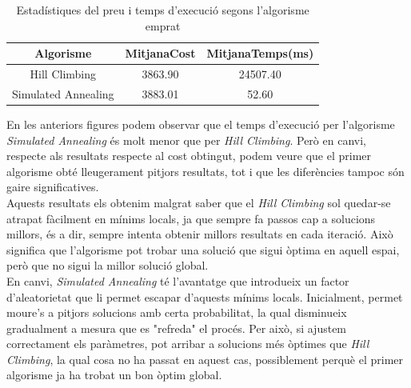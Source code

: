 \documentclass[a4paper]{article}
\begin{document}
	\begin{table}[H]
		\centering
		\begin{tabular}{|c|c|c|}
			\hline
			\textbf{Algorisme} & \textbf{MitjanaCost} & \textbf{MitjanaTemps(ms)} \\
			\hline
			Hill Climbing & 3863.90 & 24507.40\\
			\hline
			Simulated Annealing & 3883.01 & 52.60\\
			\hline
		\end{tabular}
		\caption{Estadístiques del preu i temps d'execució segons l'algorisme emprat}
		\label{tab:exp10_estadisticas}
	\end{table}

	En les anteriors figures podem observar que el temps d'execució per l'algorisme \textit{Simulated Annealing} és molt menor que per  \textit{Hill Climbing}. Però en canvi, respecte als resultats respecte al cost obtingut, podem veure que el primer algorisme obté lleugerament pitjors resultats, tot i que les diferències tampoc són gaire significatives. \\
	
	Aquests resultats els obtenim malgrat saber que el \textit{Hill Climbing} sol quedar-se atrapat fàcilment en mínims locals, ja que sempre fa passos cap a solucions millors, és a dir, sempre intenta obtenir millors resultats en cada iteració. Això significa que l'algorisme pot trobar una solució que sigui òptima en aquell espai, però que no sigui la millor solució global. \\
	
	En canvi, \textit{Simulated Annealing} té l'avantatge que introdueix un factor d'aleatorietat que li permet escapar d'aquests mínims locals. Inicialment, permet moure's a pitjors solucions amb certa probabilitat, la qual disminueix gradualment a mesura que es "refreda" el procés. Per això, si ajustem correctament els paràmetres, pot arribar a solucions més òptimes que \textit{Hill Climbing}, la qual cosa no ha passat en aquest cas, possiblement perquè el primer algorisme ja ha trobat un bon òptim global. \\
	
\end{document}
